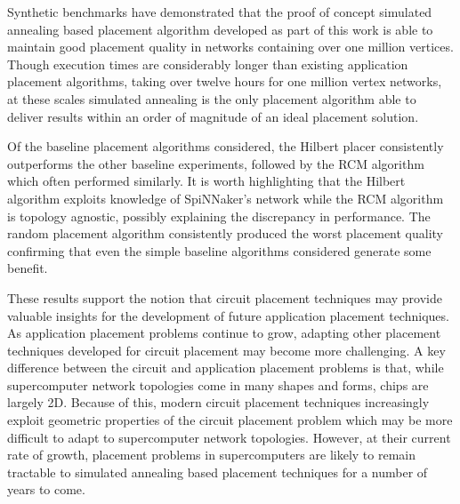 		Synthetic benchmarks have demonstrated that the proof of concept simulated
		annealing based placement algorithm developed as part of this work is able
		to maintain good placement quality in networks containing over one million
		vertices. Though execution times are considerably longer than existing
		application placement algorithms, taking over twelve hours for one million
		vertex networks, at these scales simulated annealing is the only placement
		algorithm able to deliver results within an order of magnitude of an ideal
		placement solution.
		
		Of the baseline placement algorithms considered, the Hilbert placer
		consistently outperforms the other baseline experiments, followed by the
		RCM algorithm which often performed similarly. It is worth highlighting
		that the Hilbert algorithm exploits knowledge of SpiNNaker's network while
		the RCM algorithm is topology agnostic, possibly explaining the discrepancy
		in performance. The random placement algorithm consistently produced the
		worst placement quality confirming that even the simple baseline algorithms
		considered generate some benefit.
		
		These results support the notion that circuit placement techniques may
		provide valuable insights for the development of future application
		placement techniques. As application placement problems continue to grow,
		adapting other placement techniques developed for circuit placement may
		become more challenging. A key difference between the circuit and
		application placement problems is that, while supercomputer network
		topologies come in many shapes and forms, chips are largely 2D.  Because of
		this, modern circuit placement techniques increasingly exploit geometric
		properties of the circuit placement problem which may be more difficult to
		adapt to supercomputer network topologies.  However, at their current rate
		of growth, placement problems in supercomputers are likely to remain
		tractable to simulated annealing based placement techniques for a number of
		years to come. 
